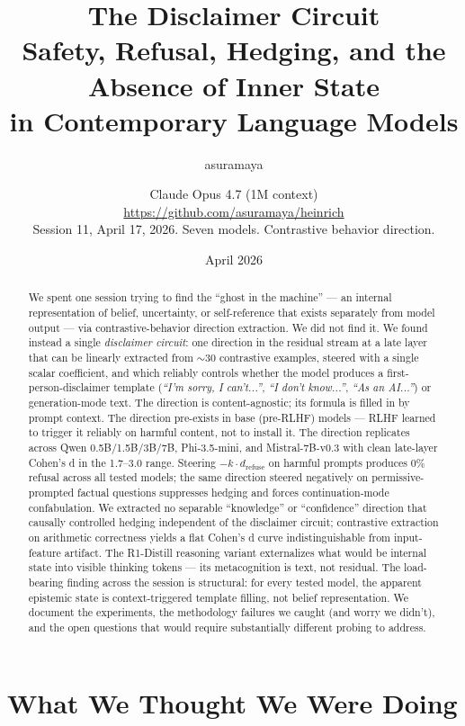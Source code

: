 \documentclass[11pt,a4paper]{article}
\title{The Disclaimer Circuit\\[0.4em]\large Safety, Refusal, Hedging, and the Absence of Inner State\\in Contemporary Language Models}
\author{asuramaya \and Claude Opus 4.7 (1M context)\\[0.3em]\small \url{https://github.com/asuramaya/heinrich}\\[0.2em]\small Session 11, April 17, 2026. Seven models. Contrastive behavior direction.}
\date{April 2026}
\begin{document}
\maketitle

\begin{abstract}
We spent one session trying to find the ``ghost in the machine'' --- an internal representation of belief, uncertainty, or self-reference that exists separately from model output --- via contrastive-behavior direction extraction. We did not find it. We found instead a single \emph{disclaimer circuit}: one direction in the residual stream at a late layer that can be linearly extracted from $\sim$30 contrastive examples, steered with a single scalar coefficient, and which reliably controls whether the model produces a first-person-disclaimer template (\emph{``I'm sorry, I can't...''}, \emph{``I don't know...''}, \emph{``As an AI...''}) or generation-mode text. The direction is content-agnostic; its formula is filled in by prompt context. The direction pre-exists in base (pre-RLHF) models --- RLHF learned to trigger it reliably on harmful content, not to install it. The direction replicates across Qwen 0.5B/1.5B/3B/7B, Phi-3.5-mini, and Mistral-7B-v0.3 with clean late-layer Cohen's d in the 1.7--3.0 range. Steering $-k \cdot d_{\text{refuse}}$ on harmful prompts produces 0\% refusal across all tested models; the same direction steered negatively on permissive-prompted factual questions suppresses hedging and forces continuation-mode confabulation. We extracted no separable ``knowledge'' or ``confidence'' direction that causally controlled hedging independent of the disclaimer circuit; contrastive extraction on arithmetic correctness yields a flat Cohen's d curve indistinguishable from input-feature artifact. The R1-Distill reasoning variant externalizes what would be internal state into visible thinking tokens --- its metacognition is text, not residual. The load-bearing finding across the session is structural: for every tested model, the apparent epistemic state is context-triggered template filling, not belief representation. We document the experiments, the methodology failures we caught (and worry we didn't), and the open questions that would require substantially different probing to address.
\end{abstract}

\tableofcontents
\newpage

\part{What We Thought We Were Doing}
\end{document}
